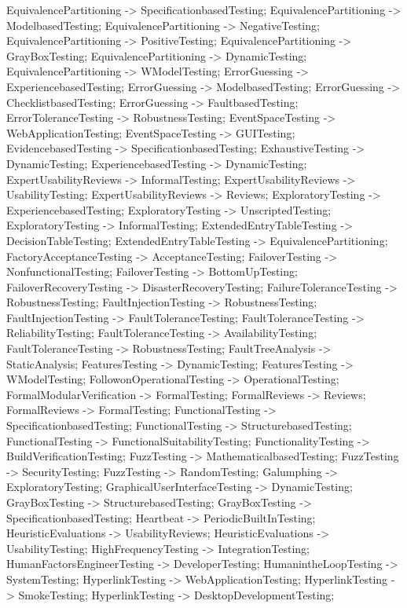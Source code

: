 \documentclass{article}
\begin{document}
{EquivalencePartitioning -> SpecificationbasedTesting;
EquivalencePartitioning -> ModelbasedTesting;
EquivalencePartitioning -> NegativeTesting;
EquivalencePartitioning -> PositiveTesting;
EquivalencePartitioning -> GrayBoxTesting;
EquivalencePartitioning -> DynamicTesting;
EquivalencePartitioning -> WModelTesting;
ErrorGuessing -> ExperiencebasedTesting;
ErrorGuessing -> ModelbasedTesting;
ErrorGuessing -> ChecklistbasedTesting;
ErrorGuessing -> FaultbasedTesting;
ErrorToleranceTesting -> RobustnessTesting;
EventSpaceTesting -> WebApplicationTesting;
EventSpaceTesting -> GUITesting;
EvidencebasedTesting -> SpecificationbasedTesting;
ExhaustiveTesting -> DynamicTesting;
ExperiencebasedTesting -> DynamicTesting;
ExpertUsabilityReviews -> InformalTesting;
ExpertUsabilityReviews -> UsabilityTesting;
ExpertUsabilityReviews -> Reviews;
ExploratoryTesting -> ExperiencebasedTesting;
ExploratoryTesting -> UnscriptedTesting;
ExploratoryTesting -> InformalTesting;
ExtendedEntryTableTesting -> DecisionTableTesting;
ExtendedEntryTableTesting -> EquivalencePartitioning;
FactoryAcceptanceTesting -> AcceptanceTesting;
FailoverTesting -> NonfunctionalTesting;
FailoverTesting -> BottomUpTesting;
FailoverRecoveryTesting -> DisasterRecoveryTesting;
FailureToleranceTesting -> RobustnessTesting;
FaultInjectionTesting -> RobustnessTesting;
FaultInjectionTesting -> FaultToleranceTesting;
FaultToleranceTesting -> ReliabilityTesting;
FaultToleranceTesting -> AvailabilityTesting;
FaultToleranceTesting -> RobustnessTesting;
FaultTreeAnalysis -> StaticAnalysis;
FeaturesTesting -> DynamicTesting;
FeaturesTesting -> WModelTesting;
FollowonOperationalTesting -> OperationalTesting;
FormalModularVerification -> FormalTesting;
FormalReviews -> Reviews;
FormalReviews -> FormalTesting;
FunctionalTesting -> SpecificationbasedTesting;
FunctionalTesting -> StructurebasedTesting;
FunctionalTesting -> FunctionalSuitabilityTesting;
FunctionalityTesting -> BuildVerificationTesting;
FuzzTesting -> MathematicalbasedTesting;
FuzzTesting -> SecurityTesting;
FuzzTesting -> RandomTesting;
Galumphing -> ExploratoryTesting;
GraphicalUserInterfaceTesting -> DynamicTesting;
GrayBoxTesting -> StructurebasedTesting;
GrayBoxTesting -> SpecificationbasedTesting;
Heartbeat -> PeriodicBuiltInTesting;
HeuristicEvaluations -> UsabilityReviews;
HeuristicEvaluations -> UsabilityTesting;
HighFrequencyTesting -> IntegrationTesting;
HumanFactorsEngineerTesting -> DeveloperTesting;
HumanintheLoopTesting -> SystemTesting;
HyperlinkTesting -> WebApplicationTesting;
HyperlinkTesting -> SmokeTesting;
HyperlinkTesting -> DesktopDevelopmentTesting;
}
\end{document}
